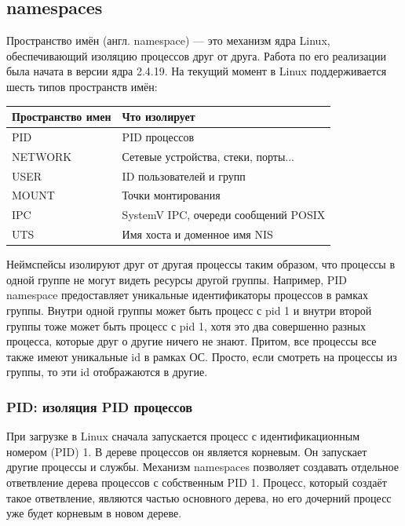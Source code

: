\subsection{namespaces}

Пространство имён (англ. namespace) — это механизм ядра Linux, обеспечивающий изоляцию процессов друг от друга. Работа по его реализации была начата в версии ядра 2.4.19. На текущий момент в Linux поддерживается шесть типов пространств имён:

\begin{table}[]
\begin{tabular}{|l|l|}
\hline
Пространство имен & Что изолирует  \\ \hline
PID & PID процессов  \\ \hline
NETWORK & Сетевые устройства, стеки, порты... \\ \hline
USER & ID пользователей и групп \\ \hline
MOUNT & Точки монтирования \\ \hline
IPC & SystemV IPC, очереди сообщений POSIX \\ \hline
UTS & Имя хоста и доменное имя NIS \\ \hline
\end{tabular}
\end{table}

Неймспейсы изолируют друг от другая процессы таким образом, что процессы в одной группе не могут видеть ресурсы другой группы. Например, PID namespace предоставляет уникальные идентификаторы процессов в рамках группы. Внутри одной группы может быть процесс с pid 1 и внутри второй группы тоже может быть процесс с pid 1, хотя это два совершенно разных процесса, которые друг о другие ничего не знают. Притом, все процессы все также имеют уникальные id в рамках ОС. Просто, если смотреть на процессы из группы, то эти id отображаются в другие.

\subsubsection{PID: изоляция PID процессов}

При загрузке в Linux сначала запускается процесс с идентификационным номером (PID) 1. В дереве процессов он является корневым. Он запускает другие процессы и службы. Механизм namespaces позволяет создавать отдельное ответвление дерева процессов с собственным PID 1. Процесс, который создаёт такое ответвление, являются частью основного дерева, но его дочерний процесс уже будет корневым в новом дереве.

